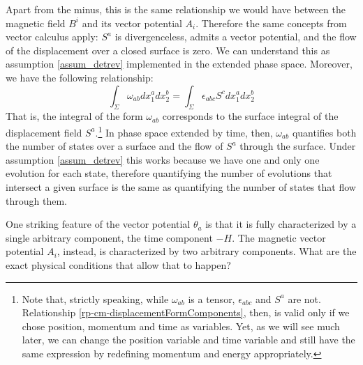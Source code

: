 Apart from the minus, this is the same relationship we would have between the magnetic field $B^i$ and its vector potential $A_i$. Therefore the same concepts from vector calculus apply: $S^a$ is divergenceless, admits a vector potential, and the flow of the displacement over a closed surface is zero. We can understand this as assumption \ref{assum_detrev} implemented in the extended phase space. Moreover, we have the following relationship:
\begin{equation}
	\int_{\Sigma} \omega_{ab} dx_1^a dx_2^b = \int_{\Sigma} \epsilon_{abc}S^c dx_1^a dx_2^b
\end{equation}
That is, the integral of the form $\omega_{ab}$ corresponds to the surface integral of the displacement field $S^a$.\footnote{Note that, strictly speaking, while $\omega_{ab}$ is a tensor, $\epsilon_{abc}$ and $S^a$ are not. Relationship \ref{rp-cm-displacementFormComponents}, then, is valid only if we chose position, momentum and time as variables. Yet, as we will see much later, we can change the position variable and time variable and still have the same expression by redefining momentum and energy appropriately.} In phase space extended by time, then, $\omega_{ab}$ quantifies both the number of states over a surface and the flow of $S^a$ through the surface. Under assumption \ref{assum_detrev} this works because we have one and only one evolution for each state, therefore quantifying the number of evolutions that intersect a given surface is the same as quantifying the number of states that flow through them.

One striking feature of the vector potential $\theta_a$ is that it is fully characterized by a single arbitrary component, the time component $-H$. The magnetic vector potential $A_i$, instead, is characterized by two arbitrary components. What are the exact physical conditions that allow that to happen?

